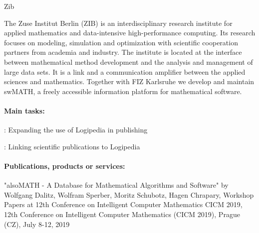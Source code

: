 \begin{sitedescription}{Zib}



The Zuse Institut Berlin (ZIB) is an interdisciplinary research institute
for applied mathematics and data-intensive high-performance computing.
Its research focuses on modeling, simulation and optimization
with scientific cooperation partners from academia and industry.
The institute is located at the interface between mathematical method
development and the analysis and management of large data sets.
It is a link and a communication amplifier between the applied sciences and
mathematics.  Together with FIZ Karlsruhe we develop and maintain swMATH,  a freely
accessible information platform for mathematical software.

\paragraph*{Main tasks:}


	
\begin{compactitem}
	\item 	 {}: Expanding the use of  Logipedia in publishing
    \item 	 {}: Linking scientific publications to Logipedia 
\end{compactitem}

 


\paragraph*{Publications, products or services:}


\begin{compactitem}
\item "alsoMATH - A Database for Mathematical Algorithms and Software" 
by Wolfgang Dalitz, Wolfram Sperber, Moritz Schubotz, Hagen Chrapary, 
Workshop Papers at 12th Conference on Intelligent Computer Mathematics CICM 2019, 
12th Conference on Intelligent Computer Mathematics (CICM 2019), Prague (CZ), July 8-12, 2019 


\end{compactitem}
\end{sitedescription}
